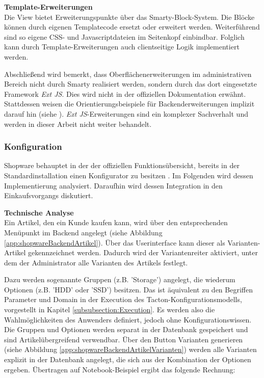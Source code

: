 \documentclass[12pt,a4paper,bibliography=totocnumbered,listof=totoc]{scrartcl}
\begin{document}
\textbf{Template-Erweiterungen}\\
Die View bietet Erweiterungspunkte über das Smarty-Block-System. Die Blöcke können durch eigenen Templatecode ersetzt oder erweitert werden. Weiterführend sind so eigene CSS- und Javascriptdateien im Seitenkopf einbindbar. Folglich kann durch Template-Erweiterungen auch clientseitige Logik implementiert werden.

Abschließend wird bemerkt, dass Oberflächenerweiterungen im administrativen Bereich nicht durch Smarty realisiert werden, sondern durch das dort eingesetzte Framework \emph{Ext JS}. Dies wird nicht in der offiziellen Dokumentation erwähnt. Stattdessen weisen die Orientierungsbeispiele für Backenderweiterungen implizit darauf hin (siehe \citet{shopwareBackendPluginExamples}). \emph{Ext JS}-Erweiterungen sind ein komplexer Sachverhalt und werden in dieser Arbeit nicht weiter behandelt.

\subsubsection{Konfiguration}
\label{subsubsection:shopwareKonfiguration}
Shopware behauptet in der der offiziellen Funktionsübersicht, bereits in der Standardinstallation einen Konfigurator zu besitzen \citep{shopware5Funktionsuebersicht}. Im Folgenden wird dessen Implementierung analysiert. Daraufhin wird dessen Integration in den Einkaufsvorgangs diskutiert.

\textbf{Technische Analyse}\\
Ein Artikel, den ein Kunde kaufen kann, wird über den entsprechenden Menüpunkt im Backend angelegt (siehe Abbildung \ref{app:shopwareBackendArtikel}). Über das Userinterface kann dieser als \glqq Varianten-Artikel\grqq{} gekennzeichnet werden. Dadurch wird der Variantenreiter aktiviert, unter dem der Administrator alle Varianten des Artikels festlegt.

Dazu werden sogenannte \glqq Gruppen\grqq{} (z.B. 'Storage') angelegt, die wiederum \glqq Optionen\grqq{} (z.B. 'HDD' oder 'SSD') besitzen. Das ist äquivalent zu den Begriffen \glqq Parameter\grqq{} und \glqq Domain\grqq{} in der Execution des Tacton-Konfigurationsmodells, vorgestellt in Kapitel \ref{subsubsection:Execution}. Es werden also die Wahlmöglichkeiten des Anwenders definiert, jedoch ohne Konfigurationswissen. Die Gruppen und Optionen werden separat in der Datenbank gespeichert und sind Artikelübergreifend verwendbar. Über den Button \glqq Varianten generieren\grqq{} (siehe Abbildung \ref{app:shopwareBackendArtikelVarianten}) werden alle Varianten explizit in der Datenbank angelegt, die sich aus der Kombination der Optionen ergeben. Übertragen auf Notebook-Beispiel ergibt das folgende Rechnung:
\end{document}
